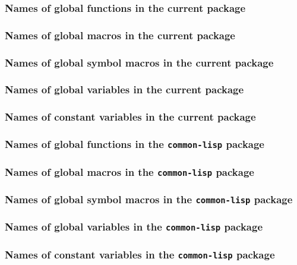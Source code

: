 \subsubsection{Names of global functions in the current package}

\subsubsection{Names of global macros in the current package}

\subsubsection{Names of global symbol macros in the current package}

\subsubsection{Names of global variables in the current package}

\subsubsection{Names of constant variables in the current package}

\subsubsection{Names of global functions in the \texttt{common-lisp} package}

\subsubsection{Names of global macros in the \texttt{common-lisp} package}

\subsubsection{Names of global symbol macros in the \texttt{common-lisp} package}

\subsubsection{Names of global variables in the \texttt{common-lisp} package}

\subsubsection{Names of constant variables in the \texttt{common-lisp} package}

